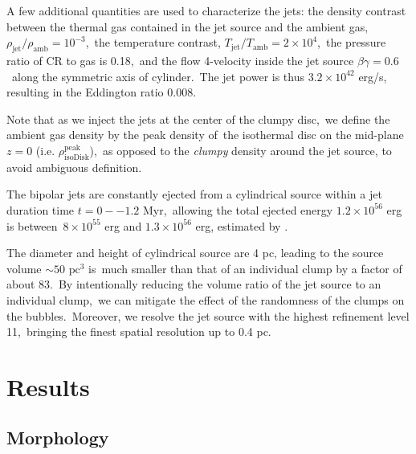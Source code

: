 \documentclass[twocolumn]{aastex631}
\begin{document}
  A few additional quantities are used to characterize the jets:
  the density contrast between the thermal gas contained in the jet source and the ambient gas,\
  $\rho_{\text{jet}}/\rho_{\text{amb}}=10^{-3}$,\
  the temperature contrast, $T_{\text{jet}}/T_{\text{amb}}=2\times10^{4}$,\
  the pressure ratio of CR to gas is 0.18,\
  and the flow 4-velocity inside the jet source $\beta\gamma = 0.6$\
  along the symmetric axis of cylinder.\
  The jet power is thus $3.2\times 10^{42}$ erg/s, resulting in the Eddington ratio 0.008.

  Note that as we inject the jets at the center of the clumpy disc,\
  we define the ambient gas density by the peak density of\
  the isothermal disc on the mid-plane $z=0$ (i.e. $\rho^{\text{peak}}_{\text{isoDisk}}$),\
  as opposed to the \textit{clumpy} density around the jet source, to avoid ambiguous definition.


  The bipolar jets are constantly ejected from a cylindrical source within a jet duration time $t=0--1.2$ Myr,\
  allowing the total ejected energy $1.2\times10^{56}$ erg is between\
  $8\times10^{55}$ erg and $1.3\times10^{56}$ erg, estimated by \citet{Predehl2020}.\


  The diameter and height of cylindrical source are 4 pc, leading to the source volume $\sim 50 \text{ pc}^{3}$ is\
  much smaller than that of an individual clump by a factor of about 83.\
  By intentionally reducing the volume ratio of the jet source to an individual clump,\
  we can mitigate the effect of the randomness of the clumps on the bubbles.\
  Moreover, we resolve the jet source with the highest refinement level 11,\
  bringing the finest spatial resolution up to 0.4 pc.\



\section{Results}
\label{Results}

\subsection{Morphology}
\end{document}
